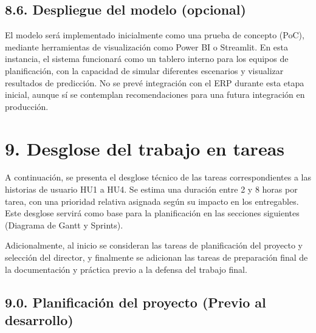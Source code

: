 \documentclass[
11pt, %
]{charter}
\begin{document}
\subsection*{8.6. Despliegue del modelo (opcional)}
El modelo será implementado inicialmente como una prueba de concepto (PoC), mediante herramientas de visualización como Power BI o Streamlit. En esta instancia, el sistema funcionará como un tablero interno para los equipos de planificación, con la capacidad de simular diferentes escenarios y visualizar resultados de predicción. No se prevé integración con el ERP durante esta etapa inicial, aunque sí se contemplan recomendaciones para una futura integración en producción.


\section{9. Desglose del trabajo en tareas}
\label{sec:wbs}

A continuación, se presenta el desglose técnico de las tareas correspondientes a las historias de usuario HU1 a HU4. Se estima una duración entre 2 y 8 horas por tarea, con una prioridad relativa asignada según su impacto en los entregables. Este desglose servirá como base para la planificación en las secciones siguientes (Diagrama de Gantt y Sprints).

Adicionalmente, al inicio se consideran las tareas de planificación del proyecto y selección del director, y finalmente se adicionan las tareas de preparación final de la documentación y práctica previo a la defensa del trabajo final.

\subsection*{9.0. Planificación del proyecto (Previo al desarrollo)}
\end{document}
